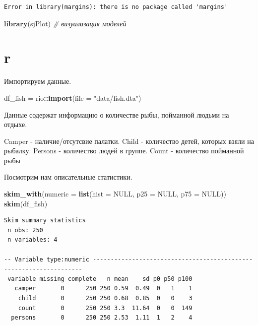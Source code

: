 \documentclass[]{book}
\newenvironment{Shaded}{\begin{snugshade}}{\end{snugshade}}
\newcommand{\CommentTok}[1]{\textcolor[rgb]{0.56,0.35,0.01}{\textit{#1}}}
\newcommand{\DataTypeTok}[1]{\textcolor[rgb]{0.13,0.29,0.53}{#1}}
\newcommand{\KeywordTok}[1]{\textcolor[rgb]{0.13,0.29,0.53}{\textbf{#1}}}
\newcommand{\NormalTok}[1]{#1}
\newcommand{\OperatorTok}[1]{\textcolor[rgb]{0.81,0.36,0.00}{\textbf{#1}}}
\newcommand{\OtherTok}[1]{\textcolor[rgb]{0.56,0.35,0.01}{#1}}
\newcommand{\StringTok}[1]{\textcolor[rgb]{0.31,0.60,0.02}{#1}}
\begin{document}
\begin{verbatim}
Error in library(margins): there is no package called 'margins'
\end{verbatim}

\begin{Shaded}
\begin{Highlighting}[]
\KeywordTok{library}\NormalTok{(sjPlot) }\CommentTok{# визуализация моделей}
\end{Highlighting}
\end{Shaded}

\hypertarget{r-1}{%
\section{r}\label{r-1}}

Импортируем данные.

\begin{Shaded}
\begin{Highlighting}[]
\NormalTok{df_fish =}\StringTok{ }\NormalTok{rio}\OperatorTok{::}\KeywordTok{import}\NormalTok{(}\DataTypeTok{file =} \StringTok{"data/fish.dta"}\NormalTok{)}
\end{Highlighting}
\end{Shaded}

Данные содержат информацию о количестве рыбы, пойманной людьми на отдыхе.

Camper - наличие/отсутсвие палатки.
Child - количество детей, которых взяли на рыбалку.
Persons - количество людей в группе.
Count - количество пойманной рыбы

Посмотрим нам описательные статистики.

\begin{Shaded}
\begin{Highlighting}[]
\KeywordTok{skim_with}\NormalTok{(}\DataTypeTok{numeric =} \KeywordTok{list}\NormalTok{(}\DataTypeTok{hist =} \OtherTok{NULL}\NormalTok{, }\DataTypeTok{p25 =} \OtherTok{NULL}\NormalTok{, }\DataTypeTok{p75 =} \OtherTok{NULL}\NormalTok{))}
\KeywordTok{skim}\NormalTok{(df_fish)}
\end{Highlighting}
\end{Shaded}

\begin{verbatim}
Skim summary statistics
 n obs: 250 
 n variables: 4 

-- Variable type:numeric -------------------------------------------------------------------
 variable missing complete   n mean    sd p0 p50 p100
   camper       0      250 250 0.59  0.49  0   1    1
    child       0      250 250 0.68  0.85  0   0    3
    count       0      250 250 3.3  11.64  0   0  149
  persons       0      250 250 2.53  1.11  1   2    4
\end{verbatim}
\end{document}
